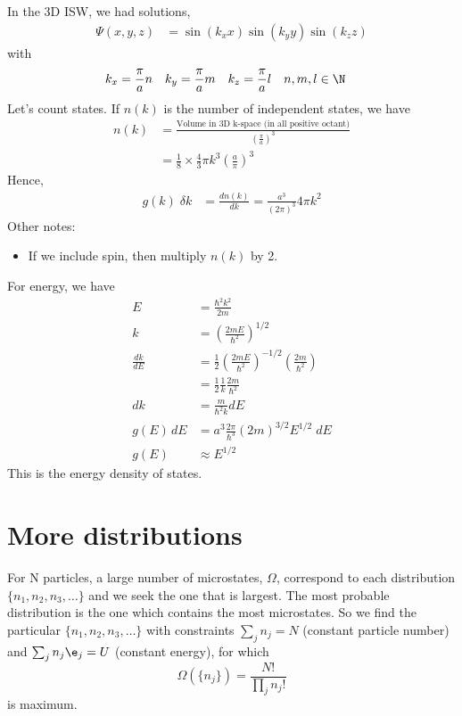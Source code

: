 \documentclass[a4paper, 11pt, normalem]{report}
\begin{document}
\begin{example}
    In the 3D ISW, we had solutions, 
    \begin{align}
        \Psi(x,y,z) &= \sin(k_xx)\sin(k_yy)\sin(k_zz)
    \end{align}
    with 
    \begin{align}
        k_x &= \frac{\pi}{a}n & k_y &= \frac{\pi}{a}m & k_z &= \frac{\pi}{a}l & n,m,l &\in \N
    \end{align}
    Let's count states.
    If $n(k)$ is the number of independent states, we have
    \begin{align}
        n(k) &= \frac{\text{Volume in 3D k-space (in all positive octant)}}{\left(\frac{\pi}{a}\right)^3} \\
             &= \frac{1}{8}\times \frac{4}{3}\pi k^3 \left(\frac{a}{\pi}\right)^3
    \end{align}
    Hence, 
    \begin{align}
        g(k)\;\delta k &= \frac{dn(k)}{dk} = \frac{a^3}{(2\pi)^3}4\pi k^2
    \end{align}
    Other notes: 
    \begin{itemize}
        \item If we include spin, then multiply $n(k)$ by 2.
    \end{itemize}
    For energy, we have 
    \begin{align}
        E &= \frac{\hbar^2 k^2}{2m} \\
        k &= \left(\frac{2mE}{\hbar^2}\right)^{1/2} \\
        \frac{dk}{dE} &= \frac{1}{2} \left(\frac{2mE}{\hbar^2}\right)^{-1/2} \left(\frac{2m}{\hbar^2}\right) \\
                               &= \frac{1}{2}\frac{1}{k}\frac{2m}{\hbar^2} \\
        dk &= \frac{m}{\hbar^2 k}dE \\
        g(E)\,dE &= a^3 \frac{2\pi}{\hbar^3} (2m)^{3/2} E^{1/2}\;dE \\
        g(E) &\approx E^{1/2}
    \end{align}
    This is the energy density of states.
\end{example}

\section{More distributions}
For N particles, a large number of microstates, $\Omega$, correspond to each distribution $\{n_1,n_2,n_3,\dots\}$ and we seek the one that is largest.
The most probable distribution is the one which contains the most microstates. 
So we find the particular $\{n_1,n_2,n_3,\dots\}$ with constraints $\sum_j n_j = N$ (constant particle number) and $\sum_j n_j\e_j = U$ (constant energy), for which
\begin{equation}
    \Omega(\{n_j\}) = \frac{N!}{\prod_j n_j!}
\end{equation}
is maximum.
\end{document}
